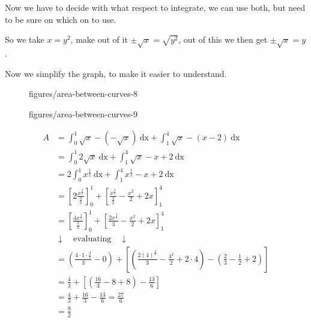 Now we have to decide with what respect to integrate, we can use both, but need
to be sure on which on to use.

So we take $x=y^2$, make out of it $\pm \sqrt{x} = \sqrt{y^2} $, out of this we then get $\pm \sqrt{x}=y$.




Now we simplify the graph, to make it easier to understand.

\begin{figure}[ht]
    \centering
    \caption{figures/area-between-curves-8}
    \label{fig:area-between-curves-8}
\end{figure}


\begin{figure}[ht]
    \centering
    \caption{figures/area-between-curves-9}
    \label{fig:area-between-curves-9}
\end{figure}

\begin{align*}
    A&= \int_{0}^{1} \sqrt{x}-(-\sqrt{x}) \ \text{dx} + \int_{1}^{4} \sqrt{x}-(x-2)\ \text{dx}   \\
     &= \int_{0}^{1} 2\sqrt{x} \ \text{dx} + \int_{1}^{4} \sqrt{x} - x + 2 \ \text{dx}    \\
     &= 2 \int_{0}^{1} x^{\frac{1}{2}}\ \text{dx}+ \int_{1}^{4} x^{\frac{1}{2}}-x+2 \ \text{dx}   \\
     &= \left[2\frac{x^{\frac{3}{2}}}{\frac{3}{2}}\right]_0^1+ \left[\frac{x^{\frac{3}{2}}}{\frac{3}{2}}-\frac{x^2}{2}+2x\right]_1^4 \\
     &= \left[\frac{4x^{\frac{3}{2}}}{\frac{3}{2}}\right]_0^1 + \left[ \frac{2x^{\frac{3}{1}}}{3}-\frac{x^2}{2}+2x \right]_1^4 \\
     &     \downarrow  \quad\text{evaluating}\quad \downarrow \\
     &= \left( \frac{4\cdot 1\cdot \frac{3}{1}}{3}-0 \right)+ \left[\left(
     \frac{2(4)^{\frac{3}{1}}}{3}- \frac{4^2}{2}+2\cdot 4  \right)-\left( \frac{2}{3}-\frac{1}{2}+2 \right)  \right]   \\
     &= \frac{4}{3}+\left[ \left(\frac{16}{3}-8+8\right) -\frac{13}{6}\right]  \\
     &= \frac{4}{3} + \frac{16}{3}-\frac{13}{6}= \frac{27}{6} \\
     &=\frac{9}{2}\\
\end{align*}

